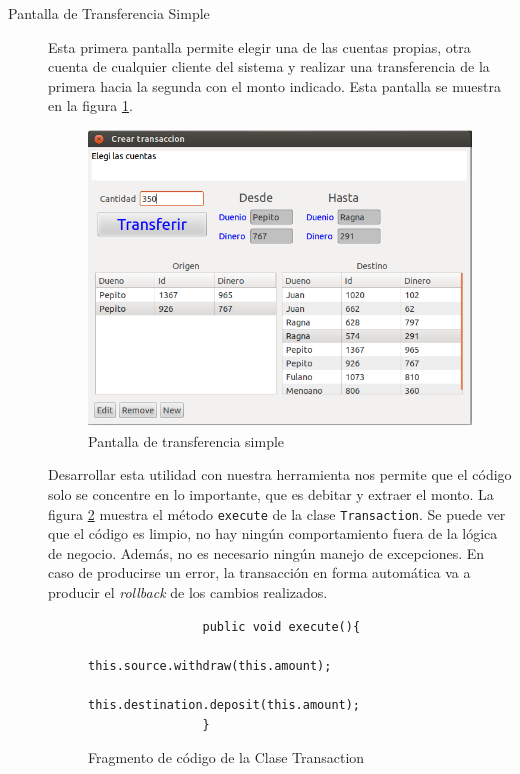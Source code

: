 \begin{description}

	\item[Pantalla de Transferencia Simple]
		Esta primera pantalla permite elegir una de las cuentas propias, otra cuenta
		de cualquier cliente del sistema y realizar una transferencia de la
		primera hacia la segunda con el monto indicado. Esta pantalla se
		muestra en la figura \ref{trasferenciaSimple}.
		
		\begin{figure}[h]
			\centering
			\includegraphics[scale=0.5]{img/simple-transferencia}
			\caption{Pantalla de transferencia simple}
			\label{trasferenciaSimple}
		\end{figure}

		Desarrollar esta utilidad con nuestra herramienta nos permite que el código
		solo se concentre en lo importante, que es debitar y extraer el monto. 
		La figura \ref{executeTransaction} muestra el método  \lstinline|execute| de la
		clase \lstinline|Transaction|. 
		Se puede ver que el código es limpio, no hay ningún comportamiento fuera de la lógica
		de negocio. 
		Además, no es necesario ningún manejo de excepciones. En caso de producirse un error, 
		la transacción en forma automática va a producir el \emph{rollback} de los cambios realizados.

		\begin{figure}[h]
			\begin{lstlisting}
				public void execute(){
					this.source.withdraw(this.amount);
					this.destination.deposit(this.amount);
				}
			\end{lstlisting}
			\caption{Fragmento de código de la Clase Transaction}
			\label{executeTransaction}
		\end{figure}
		 

\end{description}
